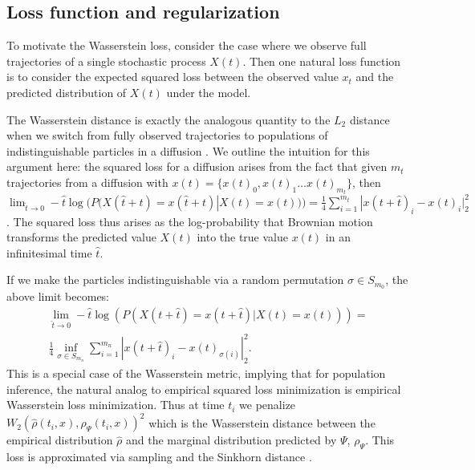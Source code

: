 \documentclass{article}
\begin{document}
\subsection{Loss function and regularization}

To motivate the Wasserstein loss, consider the case where we observe full trajectories of a single stochastic process $X(t)$. Then one natural loss function is to consider the expected squared loss between the observed value $x_t$ and the predicted distribution of $X(t)$ under the model.

The Wasserstein distance is exactly the analogous quantity to the $L_2$ distance when we switch from fully observed trajectories to populations of indistinguishable particles in a diffusion \citep[Section 3]{adams2013large}. We outline the intuition for this argument here: the squared loss for a diffusion arises from the fact that given $m_t$ trajectories from a diffusion with $x(t)=\{x(t)_0,x(t)_1\hdots x(t)_{m_t}\}$, then $\lim_{\hat{t}\to 0}-\hat{t}\log(P(X(\hat{t}+t)=x(\hat{t}+t)|X(t)=x(t))) = \frac{1}{4}\sum_{i=1}^{m_t} |x(t+\hat{t})_i-x(t)_i|_2^2$. The squared loss thus arises as the log-probability that Brownian motion transforms the predicted value $X(t)$ into the true value $x(t)$ in an infinitesimal time $\hat{t}$.

 If we make the particles indistinguishable via a random permutation $\sigma \in S_{m_0}$, the above limit becomes:
\begin{multline}
\lim_{\hat{t}\to 0}-\hat{t}\log(P(X(t+\hat{t})=x(t+\hat{t})|X(t)=x(t))) = \\
\frac{1}{4}\inf_{\sigma \in S_{m_n}}\sum_{i=1}^{m_n} |x(t+\hat{t})_i-x(t)_{\sigma(i)}|_2^2.
\end{multline}
This is a special case of the Wasserstein metric, implying that for population inference, the natural analog to empirical squared loss minimization is empirical Wasserstein loss minimization. Thus at time $t_i$ we penalize $W_2(\hat{\rho}(t_i,x),\rho_{\Psi}(t_i,x))^2$ which is the Wasserstein distance between the empirical distribution $\hat{\rho}$ and the marginal distribution predicted by $\Psi$, $\rho_{\Psi}$. This loss is approximated via sampling and the Sinkhorn distance \citep{cuturi2013sinkhorn}.
\end{document}
